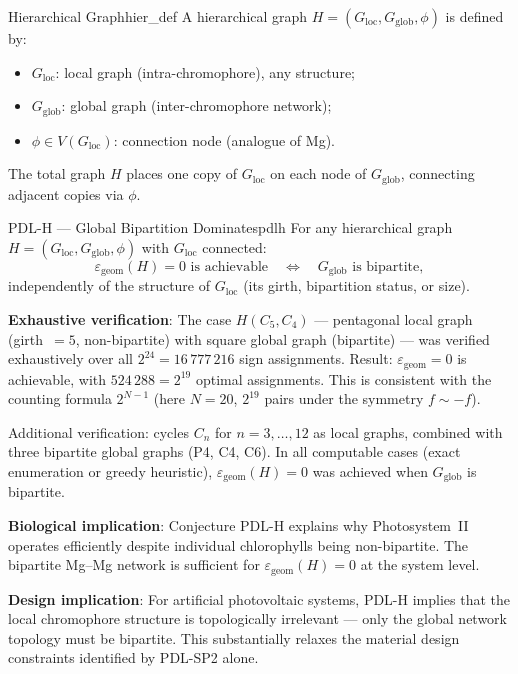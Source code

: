 \documentclass[12pt,a4paper]{article}
\newcommand{\epsgeom}{\varepsilon_{\mathrm{geom}}}
\newcommand{\Gloc}{G_{\mathrm{loc}}}
\newcommand{\Gglob}{G_{\mathrm{glob}}}
\begin{document}
\begin{definition}{Hierarchical Graph}{hier_def}
A hierarchical graph $H = (\Gloc, \Gglob, \phi)$ is defined by:
\begin{itemize}[noitemsep]
  \item $\Gloc$: local graph (intra-chromophore), any structure;
  \item $\Gglob$: global graph (inter-chromophore network);
  \item $\phi \in V(\Gloc)$: connection node (analogue of Mg).
\end{itemize}
The total graph $H$ places one copy of $\Gloc$ on each node of $\Gglob$,
connecting adjacent copies via $\phi$.
\end{definition}

\begin{conjecture}{PDL-H — Global Bipartition Dominates}{pdlh}
For any hierarchical graph $H = (\Gloc, \Gglob, \phi)$ with $\Gloc$
connected:
\[
  \epsgeom(H) = 0 \text{ is achievable}
  \quad \Longleftrightarrow \quad
  \Gglob \text{ is bipartite},
\]
independently of the structure of $\Gloc$ (its girth, bipartition
status, or size).
\end{conjecture}

\textbf{Exhaustive verification}: The case $H(C_5, C_4)$ — pentagonal
local graph (girth~$= 5$, non-bipartite) with square global graph
(bipartite) — was verified exhaustively over all $2^{24} = 16\,777\,216$
sign assignments. Result: $\epsgeom = 0$ is achievable, with
$524\,288 = 2^{19}$ optimal assignments. This is consistent with the
counting formula $2^{N-1}$ (here $N = 20$, $2^{19}$ pairs under the
symmetry $f \sim -f$).

Additional verification: cycles $C_n$ for $n = 3, \ldots, 12$ as local
graphs, combined with three bipartite global graphs (P4, C4, C6).
In all computable cases (exact enumeration or greedy heuristic),
$\epsgeom(H) = 0$ was achieved when $\Gglob$ is bipartite.

\textbf{Biological implication}: Conjecture PDL-H explains why
Photosystem~II operates efficiently despite individual chlorophylls
being non-bipartite. The bipartite Mg--Mg network is sufficient for
$\epsgeom(H) = 0$ at the system level.

\textbf{Design implication}: For artificial photovoltaic systems,
PDL-H implies that the local chromophore structure is topologically
irrelevant — only the global network topology must be bipartite.
This substantially relaxes the material design constraints identified
by PDL-SP2 alone.
\end{document}
